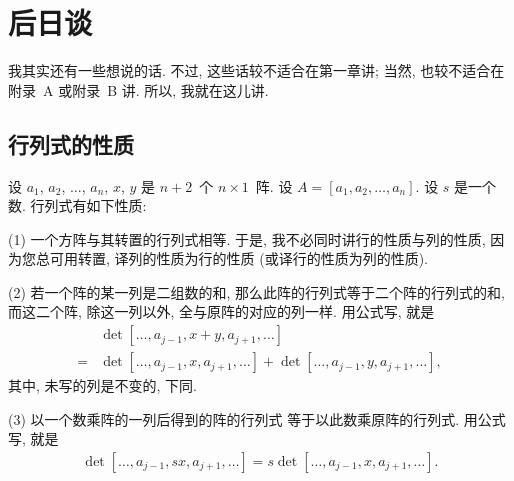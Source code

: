 \chapter{后日谈}

我其实还有一些想说的话.
不过, 这些话较不适合在第一章讲;
当然, 也较不适合在附录~A 或附录~B 讲.
所以, 我就在这儿讲.

\clearpage



\section{行列式的性质}


设 \(a_1\), \(a_2\), \(\dots\), \(a_n\), \(x\), \(y\)
是 \(n+2\)~个 \(n \times 1\)~阵.
设 \(A = [a_1, a_2, \dots, a_n]\).
设 \(s\) 是一个数.
行列式有如下性质:

\vspace{2ex}

(1)
一个方阵与其转置的行列式相等.
于是, 我不必同时讲行的性质与列的性质,
因为您总可用转置,
译列的性质为行的性质
(或译行的性质为列的性质).

(2)
若一个阵的某一列是二组数的和,
那么此阵的行列式等于二个阵的行列式的和,
而这二个阵, 除这一列以外, 全与原阵的对应的列一样.
用公式写, 就是
\begin{align*}
         & \det {[\dots, a_{j-1}, x + y, a_{j+1}, \dots]}
    \\
    = {} & \det {[\dots, a_{j-1}, x, a_{j+1}, \dots]}
    + \det {[\dots, a_{j-1}, y, a_{j+1}, \dots]},
\end{align*}
其中, 未写的列是不变的, 下同.

(3)
以一个数乘阵的一列后得到的阵的行列式%
等于以此数乘原阵的行列式.
用公式写, 就是
\begin{align*}
    \det {[\dots, a_{j-1}, sx, a_{j+1}, \dots]}
    = s \det {[\dots, a_{j-1}, x, a_{j+1}, \dots]}.
\end{align*}

